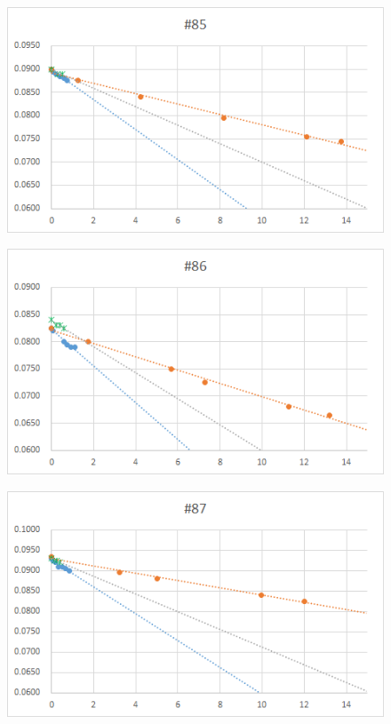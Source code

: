   \begin{figure}[htbp]
    \centering
       \includegraphics[width=120mm]{vol_085.png}
  \end{figure}
  \begin{figure}[htbp]
    \centering
       \includegraphics[width=120mm]{vol_086.png}
  \end{figure}
  \begin{figure}[htbp]
    \centering
       \includegraphics[width=120mm]{vol_087.png}
  \end{figure}
